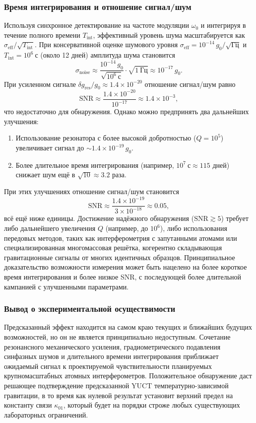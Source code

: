 \documentclass[12pt]{article}
\theoremstyle{remark}
\begin{document}
	\subsubsection{Время интегрирования и отношение сигнал/шум}
	Используя синхронное детектирование на частоте модуляции \(\omega_0\) и интегрируя в течение полного времени \(T_{\mathrm{int}}\), эффективный уровень шума масштабируется как \(\sigma_{\mathrm{eff}} / \sqrt{T_{\mathrm{int}}}\). При консервативной оценке шумового уровня \(\sigma_{\mathrm{eff}} = 10^{-14}\,g_0/\sqrt{\mathrm{Гц}}\) и \(T_{\mathrm{int}} = 10^6\ \mathrm{с}\) (около 12 дней) амплитуда шума становится
	\[
	\sigma_{\mathrm{noise}} \approx \frac{10^{-14}\,g_0}{\sqrt{10^6\ \mathrm{с}}} \cdot \sqrt{1\ \mathrm{Гц}} \approx 10^{-17}\,g_0.
	\]
	При усиленном сигнале \(\delta g_{\mathrm{res}}/g_0 \approx 1.4\times10^{-20}\) отношение сигнал/шум равно
	\[
	\mathrm{SNR} \approx \frac{1.4\times10^{-20}}{10^{-17}} \approx 1.4\times10^{-3},
	\]
	что недостаточно для обнаружения. Однако можно предпринять два дальнейших улучшения:
	\begin{enumerate}
		\item Использование резонатора с более высокой добротностью (\(Q = 10^5\)) увеличивает сигнал до \(\sim 1.4\times10^{-19}\,g_0\).
		\item Более длительное время интегрирования (например, \(10^7\ \mathrm{с} \approx 115\) дней) снижает шум ещё в \(\sqrt{10} \approx 3.2\) раза.
	\end{enumerate}
	При этих улучшениях отношение сигнал/шум становится
	\[
	\mathrm{SNR} \approx \frac{1.4\times10^{-19}}{3\times10^{-18}} \approx 0.05,
	\]
	всё ещё ниже единицы. Достижение надёжного обнаружения (\(\mathrm{SNR} \gtrsim 5\)) требует либо дальнейшего увеличения \(Q\) (например, до \(10^6\)), либо использования передовых методов, таких как интерферометрия с запутанными атомами или специализированная многомассовая решётка, когерентно складывающая гравитационные сигналы от многих идентичных образцов. Принципиальное доказательство возможности измерения может быть нацелено на более короткое время интегрирования и более низкое SNR, с последующей более длительной кампанией с улучшенными параметрами.
	
	\subsubsection{Вывод о экспериментальной осуществимости}
	Предсказанный эффект находится на самом краю текущих и ближайших будущих возможностей, но он не является принципиально недоступным. Сочетание резонансного механического усиления, градиометрического подавления синфазных шумов и длительного времени интегрирования приближает ожидаемый сигнал к проектируемой чувствительности планируемых крупномасштабных атомных интерферометров. Положительное обнаружение даст решающее подтверждение предсказанной YUCT температурно-зависимой гравитации, в то время как нулевой результат установит верхний предел на константу связи \(\kappa_{01}\), который будет на порядки строже любых существующих лабораторных ограничений.
	
\end{document}
